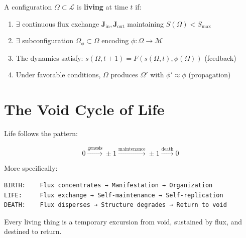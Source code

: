 \documentclass[
  11pt,
  letterpaper,
  twoside,
  openright]{book}
\begin{document}
\begin{tcolorbox}[enhanced jigsaw, leftrule=.75mm, title=\textcolor{quarto-callout-important-color}{\faExclamation}\hspace{0.5em}{Definition (Formal)}, bottomrule=.15mm, opacityback=0, coltitle=black, arc=.35mm, colframe=quarto-callout-important-color-frame, colbacktitle=quarto-callout-important-color!10!white, colback=white, titlerule=0mm, breakable, bottomtitle=1mm, toptitle=1mm, rightrule=.15mm, toprule=.15mm, left=2mm, opacitybacktitle=0.6]

A configuration \(\Omega \subset \mathcal{L}\) is \textbf{living} at
time \(t\) if:

\begin{enumerate}
\def\labelenumi{\arabic{enumi}.}
\item
  \(\exists\) continuous flux exchange
  \(\mathbf{J}_{\text{in}}, \mathbf{J}_{\text{out}}\) maintaining
  \(S(\Omega) < S_{\text{max}}\)
\item
  \(\exists\) subconfiguration \(\Omega_\phi \subset \Omega\) encoding
  \(\phi: \Omega \to \mathcal{M}\)
\item
  The dynamics satisfy:
  \(s(\Omega, t+1) = F(s(\Omega, t), \phi(\Omega))\) (feedback)
\item
  Under favorable conditions, \(\Omega\) produces \(\Omega'\) with
  \(\phi' \approx \phi\) (propagation)
\end{enumerate}

\end{tcolorbox}

\section{The Void Cycle of Life}\label{the-void-cycle-of-life}

Life follows the pattern:

\[0 \xrightarrow{\text{genesis}} \pm 1 \xrightarrow{\text{maintenance}} \pm 1 \xrightarrow{\text{death}} 0\]

More specifically:

\begin{verbatim}
BIRTH:    Flux concentrates → Manifestation → Organization
LIFE:     Flux exchange → Self-maintenance → Self-replication
DEATH:    Flux disperses → Structure degrades → Return to void
\end{verbatim}

Every living thing is a temporary excursion from void, sustained by
flux, and destined to return.
\end{document}
